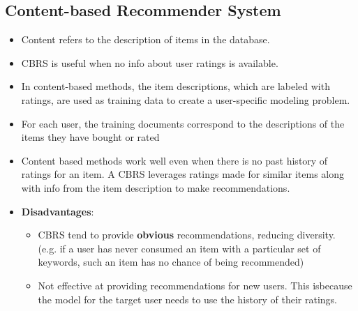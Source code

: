 \documentclass{article}
\begin{document}
\subsection{Content-based Recommender System}
\begin{itemize}
    \item Content refers to the description of items in the database.
    
    \item CBRS is useful when no info about user ratings is available. 
    
    \item In content-based methods, the item descriptions, which are labeled with ratings, are used as training data to create a user-specific modeling problem.
    
    \item  For each user, the training documents correspond to the descriptions of the items they have bought or rated
    
    \item Content based methods work well even when there is no past history of ratings for an item. A CBRS leverages ratings made for similar items along with info from the item description to make recommendations. 
    
    \item \textbf{Disadvantages}:
    \begin{itemize}
        \item CBRS tend to provide \textbf{obvious} recommendations, reducing diversity. (e.g. if a user has never consumed an item with a particular set of keywords, such an item has no chance of being recommended) 
        
        \item Not effective at providing recommendations for new users. This isbecause the   model for the target user needs to use the history of their ratings.
    \end{itemize}
\end{itemize}
\end{document}
